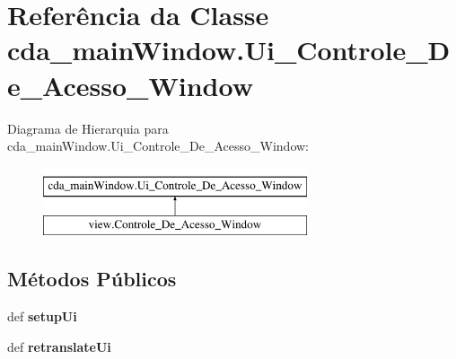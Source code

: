\hypertarget{classcda__mainWindow_1_1Ui__Controle__De__Acesso__Window}{\section{\-Referência da \-Classe cda\-\_\-main\-Window.\-Ui\-\_\-\-Controle\-\_\-\-De\-\_\-\-Acesso\-\_\-\-Window}
\label{classcda__mainWindow_1_1Ui__Controle__De__Acesso__Window}
}
\-Diagrama de \-Hierarquia para cda\-\_\-main\-Window.\-Ui\-\_\-\-Controle\-\_\-\-De\-\_\-\-Acesso\-\_\-\-Window\-:\begin{figure}[H]
\begin{center}
\leavevmode
\includegraphics[height=2.000000cm]{classcda__mainWindow_1_1Ui__Controle__De__Acesso__Window}
\end{center}
\end{figure}
\subsection*{\-Métodos \-Públicos}
\begin{DoxyCompactItemize}
\item 
\hypertarget{classcda__mainWindow_1_1Ui__Controle__De__Acesso__Window_a6cd701d02ee70670d333fff3a2dcc12e}{def {\bfseries setup\-Ui}}\label{classcda__mainWindow_1_1Ui__Controle__De__Acesso__Window_a6cd701d02ee70670d333fff3a2dcc12e}

\item 
\hypertarget{classcda__mainWindow_1_1Ui__Controle__De__Acesso__Window_a23a9c1b9a73d180987b354345b29104b}{def {\bfseries retranslate\-Ui}}\label{classcda__mainWindow_1_1Ui__Controle__De__Acesso__Window_a23a9c1b9a73d180987b354345b29104b}

\end{DoxyCompactItemize}
